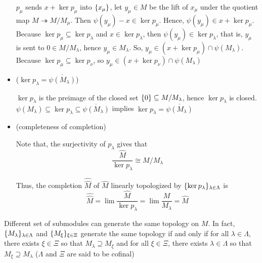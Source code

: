 \begin{longproof}
\begin{itemize}
	\begin{center}
	\end{center}
	
	$p_\mu$ sends $x + \ker p_\mu$ into $\{x_\mu\}$, let $y_\mu \in M$ be the lift of $x_\mu$ under the quotient map $M \twoheadrightarrow M / M_\mu$. Then $\psi(y_\mu) - x \in \ker p_\mu$. Hence, $\psi(y_\mu) \in x + \ker p_\mu$. Because $\ker p_\mu \subseteq \ker p_\lambda$ and $x \in \ker p_\lambda$, then $\psi(y_\mu) \in \ker p_\lambda$, that is, $y_\mu$ is sent to $0 \in M / M_\lambda$, hence $y_\mu \in M_\lambda$. So, $y_\mu \in (x + \ker p_\mu) \cap \psi(M_\lambda)$. Because $\ker p_\mu \subseteq \ker p_\nu$, so $y_\mu \in (x + \ker p_\nu) \cap \psi(M_\lambda)$
 		
	\item ($\ker p_\lambda = \overline{\psi(M_\lambda)}$)
	
	$\ker p_\lambda$ is the preimage of the closed set $\{0\} \subseteq M / M_\lambda$, hence $\ker p_\lambda$ is closed. $\psi(M_\lambda) \subseteq \ker p_\lambda \subseteq \overline{\psi(M_\lambda)}$ implies $\ker p_\lambda = \overline{\psi(M_\lambda)}$
	
	\item (completeness of completion)
	
	Note that, the surjectivity of $p_\lambda$ gives that
	$$
		\frac{\hat{M}}{\ker p_\lambda} \cong M / M_\lambda
	$$
	
	Thus, the completion $\hat{\hat{M}}$ of $\hat{M}$ linearly topologized by $\{\ker p_\lambda\}_{\lambda \in \Lambda}$ is
	$$
		\hat{\hat{M}} = \lim \frac{\hat{M}}{\ker p_\lambda} = \lim \frac{M}{M_\lambda} = \hat{M}
	$$

	\end{itemize}
\end{longproof}

\begin{remark}
	Different set of submodules can generate the same topology on $M$. In fact, $\{M_\lambda\}_{\lambda \in \Lambda}$ and $\{M_\xi\}_{\xi \in \Xi}$ generate the same topology if and only if for all $\lambda \in \Lambda$, there exists $\xi \in \Xi$ so that $M_\lambda \supseteq M_\xi$ and for all $\xi \in \Xi$, there exists $\lambda \in \Lambda$ so that $M_\xi \supseteq M_\lambda$ ($\Lambda$ and $\Xi$ are said to be cofinal)
\end{remark}

